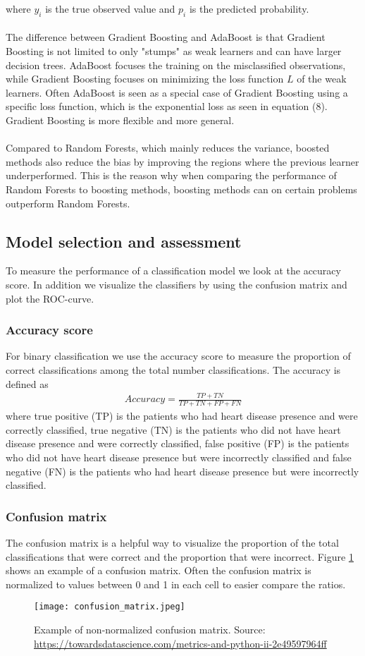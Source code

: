 \documentclass[a4paper,twocolumn]{article}
\begin{document}
where $y_{i}$ is the true observed value and $p_{i}$ is the predicted probability.\\
\\
The difference between Gradient Boosting and AdaBoost is that Gradient Boosting is not limited to only "stumps" as weak learners and can have larger decision trees. AdaBoost focuses the training on the misclassified observations, while Gradient Boosting focuses on minimizing the loss function $L$ of the weak learners. Often AdaBoost is seen as a special case of Gradient Boosting using a specific loss function, which is the exponential loss as seen in equation (8). Gradient Boosting is more flexible and more general.\\
\\
Compared to Random Forests, which mainly reduces the variance\cite[p.~588]{hastie}, boosted methods also reduce the bias by improving the regions where the previous learner underperformed. This is the reason why when comparing the performance of Random Forests to boosting methods, boosting methods can on certain problems outperform Random Forests.
\subsection{Model selection and assessment}
To measure the performance of a classification model we look at the accuracy score. In addition we visualize the classifiers by using the confusion matrix and plot the ROC-curve. 
\subsubsection{Accuracy score}
For binary classification we use the accuracy score to measure the proportion of correct classifications among the total number classifications. The accuracy is defined as
\begin{align}
    Accuracy = \frac{TP + TN}{TP + TN + FP + FN}
\end{align}
where true positive (TP) is the patients who had heart disease presence and were correctly classified, true negative (TN) is the patients who did not have heart disease presence and were correctly classified, false positive (FP) is the patients who did not have heart disease presence but were incorrectly classified and false negative (FN) is the patients who had heart disease presence but were incorrectly classified.
\subsubsection{Confusion matrix}
The confusion matrix is a helpful way to visualize the proportion of the total classifications that were correct and the proportion that were incorrect. Figure \ref{fig:3} shows an example of a confusion matrix. Often the confusion matrix is normalized to values between 0 and 1 in each cell to easier compare the ratios.
\begin{figure}[ht]
    \centering
    \texttt{[image: confusion\_matrix.jpeg]}
    \caption{Example of non-normalized confusion matrix. Source: \href{https://towardsdatascience.com/metrics-and-python-ii-2e49597964ff}{https://towardsdatascience.com/metrics-and-python-ii-2e49597964ff}}
    \label{fig:3}
\end{figure}
\end{document}
